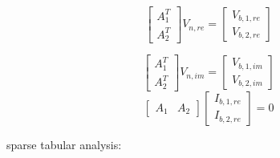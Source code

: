 \documentclass{book}
\begin{document}
\tableofcontents

\begin{equation}
\begin{bmatrix}
A_{1}^{T}\\
A_{2}^{T}
\end{bmatrix}
V_{n,re}
=
\begin{bmatrix}
V_{b,1,re}\\
V_{b,2,re}
\end{bmatrix}
\end{equation}

\begin{equation}
\begin{bmatrix}
A_{1}^{T}\\
A_{2}^{T}
\end{bmatrix}
V_{n,im}
=
\begin{bmatrix}
V_{b,1,im}\\
V_{b,2,im}
\end{bmatrix}
\end{equation}
\begin{equation}
\begin{bmatrix}
A_1&A_2
\end{bmatrix}
\begin{bmatrix}
I_{b,1,re}\\
I_{b,2,re}
\end{bmatrix}
=0
\end{equation}

sparse tabular analysis:
\end{document}
